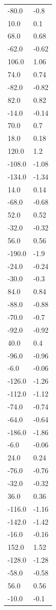 \begin{longtable}{ll}
-80.0 & -0.8 \\
10.0 & 0.1 \\
68.0 & 0.68 \\
-62.0 & -0.62 \\
106.0 & 1.06 \\
74.0 & 0.74 \\
-82.0 & -0.82 \\
82.0 & 0.82 \\
-14.0 & -0.14 \\
70.0 & 0.7 \\
18.0 & 0.18 \\
120.0 & 1.2 \\
-108.0 & -1.08 \\
-134.0 & -1.34 \\
14.0 & 0.14 \\
-68.0 & -0.68 \\
52.0 & 0.52 \\
-32.0 & -0.32 \\
56.0 & 0.56 \\
-190.0 & -1.9 \\
-24.0 & -0.24 \\
-30.0 & -0.3 \\
84.0 & 0.84 \\
-88.0 & -0.88 \\
-70.0 & -0.7 \\
-92.0 & -0.92 \\
40.0 & 0.4 \\
-96.0 & -0.96 \\
-6.0 & -0.06 \\
-126.0 & -1.26 \\
-112.0 & -1.12 \\
-74.0 & -0.74 \\
-64.0 & -0.64 \\
-186.0 & -1.86 \\
-6.0 & -0.06 \\
24.0 & 0.24 \\
-76.0 & -0.76 \\
-32.0 & -0.32 \\
36.0 & 0.36 \\
-116.0 & -1.16 \\
-142.0 & -1.42 \\
-16.0 & -0.16 \\
152.0 & 1.52 \\
-128.0 & -1.28 \\
-58.0 & -0.58 \\
56.0 & 0.56 \\
-10.0 & -0.1 \\

\end{longtable}
